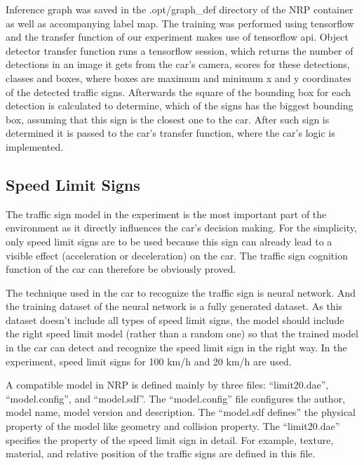 Inference graph was saved in the .opt/graph\_def directory of the NRP container as well as accompanying label map. The training was performed using tensorflow and the transfer function of our experiment makes use of tensorflow api. Object detector transfer function runs a tensorflow session, which returns the number of detections in an image it gets from the car's camera, scores for these detections, classes and boxes, where boxes are maximum and minimum x and y coordinates of the detected traffic signs. Afterwards the square of the bounding box for each detection is calculated to determine, which of the signs has the biggest bounding box, assuming that this sign is the closest one to the car. After such sign is determined it is passed to the car's transfer function, where the car's logic is implemented. 


\subsection{Speed Limit Signs}

The traffic sign model in the experiment is the most important part of the environment as it directly influences the car’s decision making. For the simplicity, only speed limit signs are to be used because this sign can already lead to a visible effect (acceleration or deceleration) on the car. The traffic sign cognition function of the car can therefore be obviously proved. 



The technique used in the car to recognize the traffic sign is neural network. And the training dataset of the neural network is a fully generated dataset. As this dataset doesn’t include all types of speed limit signs, the model should include the right speed limit model (rather than a random one) so that the trained model in the car can detect and recognize the speed limit sign in the right way. In the experiment, speed limit signs for 100 km/h and 20 km/h are used.



A compatible model in NRP is defined mainly by three files: ``limit20.dae'', ``model.config'', and ``model.sdf''. The ``model.config'' file configures the author, model name, model version and description. The ``model.sdf defines'' the physical property of the model like geometry and collision property. The ``limit20.dae'' specifies the property of the speed limit sign in detail. For example, texture, material, and relative position of the traffic signs are defined in this file.



